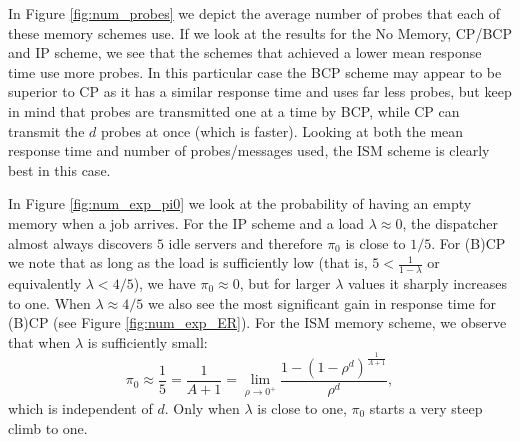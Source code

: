 \documentclass[12pt]{report}
\newcommand{\E}{\mathbb{E}}
\begin{document}
In Figure \ref{fig:num_probes} we depict the average number of probes that each of these memory schemes use. If we look at the results for the No Memory, CP/BCP and IP scheme, we see that the schemes
that achieved a lower mean response time use more probes. In this particular case the BCP scheme 
may appear to be superior to CP as it has a similar response time and uses far less probes, but keep
in mind that probes are transmitted one at a time by BCP, while CP can transmit the $d$ probes at
once (which is faster). Looking at both the mean response time and number of probes/messages used, the ISM scheme is clearly best in this case. 


In Figure \ref{fig:num_exp_pi0} we look at the probability of having an empty memory when a job
arrives.  For the IP scheme and a load $\lambda \approx 0$, the dispatcher almost always discovers 
$5$ idle servers and therefore $\pi_0$ is close to $1/5$. For (B)CP we note that as long
as the load is sufficiently low (that is, $5 < \frac{1}{1-\lambda}$ or equivalently $\lambda<4/5$), we have $\pi_0\approx 0$, but for larger $\lambda$ values it sharply increases to one. When $\lambda \approx 4/5$ we also see the most significant gain in response time for (B)CP (see Figure \ref{fig:num_exp_ER}). For the ISM memory scheme, we observe that when $\lambda$ is sufficiently small: 
$$
\pi_0\approx \frac{1}{5} = \frac{1}{A+1} = \lim_{\rho \rightarrow 0^+} \frac{1-(1-\rho^d)^{\frac{1}{A+1}}}{\rho^d},
$$
which is independent of $d$. Only when $\lambda$ is close to one, $\pi_0$ starts a very steep climb to one.
\end{document}
